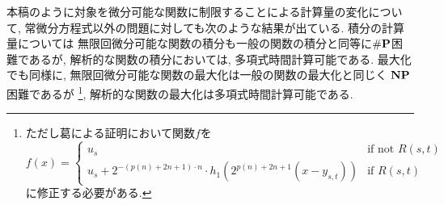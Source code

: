 本稿のように対象を微分可能な関数に制限することによる計算量の変化について,
常微分方程式以外の問題に対しても次のような結果が出ている.
積分の計算量については
無限回微分可能な関数の積分も一般の関数の積分と同等に$\mathbf{\#P}$困難であるが,
解析的な関数の積分においては, 多項式時間計算可能である\cite[定理5.33]{ko1991complexity}.
最大化でも同様に, 無限回微分可能な関数の最大化は一般の関数の最大化と同じく
$\mathbf{NP}$困難であるが
\footnote{
ただし葛\cite[定理3.7]{ko1991complexity}による証明において関数$f$を
\[f(x) = 
\begin{cases}
 u_s & \text{if not } R(s,t) \\
 u_s + 2^{-(p(n)+2n+1)\cdot n} \cdot h_1(2^{p(n)+2n+1} (x - y_{s,t})) & \text{if } R(s,t)
\end{cases}\]
に修正する必要がある.
},
解析的な関数の最大化は多項式時間計算可能である\cite[定理3.7]{ko1991complexity}.

